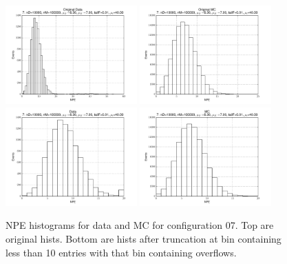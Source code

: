  \begin{figure}[htbp] \begin{center} 
\includegraphics[width=0.45\textwidth]{../FIGURES/07/FIG_Original_Data.pdf} 
\includegraphics[width=0.45\textwidth]{../FIGURES/07/FIG_Original_MC.pdf} 
\includegraphics[width=0.45\textwidth]{../FIGURES/07/FIG_Data.pdf} 
\includegraphics[width=0.45\textwidth]{../FIGURES/07/FIG_MC.pdf} 
\caption{NPE histograms for data and MC for configuration 07. Top are original hists. Bottom are hists after truncation at bin containing less than 10 entries with that bin containing overflows.} 
\label{tab:npe_07} 
\end{center} \end{figure} 

 